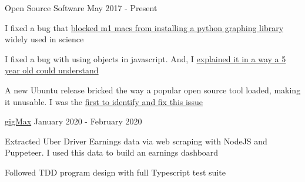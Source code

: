 

\begin{cventries}



  \cventry
    {} %
    {Open Source Software} %
    {} %
    {May 2017 - Present} %
    {
      \begin{cvitems} %
      \item{I fixed a bug that \href{https://github.com/pygraphviz/pygraphviz/issues/398#issuecomment-10384769210}{blocked m1 macs from installing a python graphing library} widely used in science}
      \item{I fixed a bug with using objects in javascript. And, I \href{https://stackoverflow.com/questions/10107198/javascript-not-a-constructor-exception-while-creating-objects/59180877#59180877}{explained it in a way a 5 year old could understand}}
      \item{A new Ubuntu release bricked the way a popular open source tool loaded, making it unusable. I was the \href{https://askubuntu.com/questions/1242139/youtube-dl-usr-bin-env-python-no-such-file-or-directory/}{first to identify and fix this issue}}
      \end{cvitems}
    }
  \cventry
    {} %
    {\href{https://github.com/geofflangenderfer/gigMax}{gigMax}} %
    {} %
    {January 2020 - February 2020} %
    {
      \begin{cvitems} %
      \item {Extracted Uber Driver Earnings data via web scraping with NodeJS and Puppeteer. I used this data to build an earnings dashboard}
      \item {Followed TDD program design with full Typescript test suite}
      \end{cvitems}
    }

\end{cventries}

